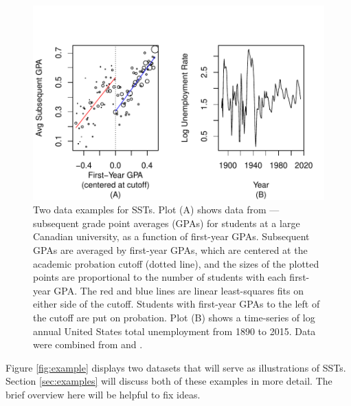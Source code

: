 \documentclass[12pt]{article}\usepackage[]{graphicx}\usepackage[]{color}
\makeatletter
\def\maxwidth{ %
  \ifdim\Gin@nat@width>\linewidth
    \linewidth
  \else
    \Gin@nat@width
  \fi
}
\makeatother
\begin{document}
\begin{figure}

\includegraphics[width=\maxwidth]{figure/examplePlots-1} 

\caption{Two data examples for SSTs. Plot (A) shows data from
  \citet{lso}---subsequent grade point averages (GPAs) for students
  at a large Canadian university, as a function of first-year
  GPAs. Subsequent GPAs are averaged by first-year GPAs, which are
  centered at the academic probation cutoff (dotted line), and the sizes
  of the plotted points are proportional to the number of students
  with each first-year GPA. The red and blue lines are linear least-squares
  fits on either side of the cutoff. Students with first-year GPAs
  to the left of  the cutoff are put on probation. Plot (B) shows a
  time-series of log annual United States total unemployment from 1890 to
  2015. Data were combined from \citet{urca} and \citet{cps}.}
\label{fig:examples}
\end{figure}


Figure \ref{fig:example} displays two datasets that will serve as
illustrations of SSTs.
Section \ref{sec:examples} will discuss both of these examples in more
detail.
The brief overview here will be helpful to fix ideas.
\end{document}
